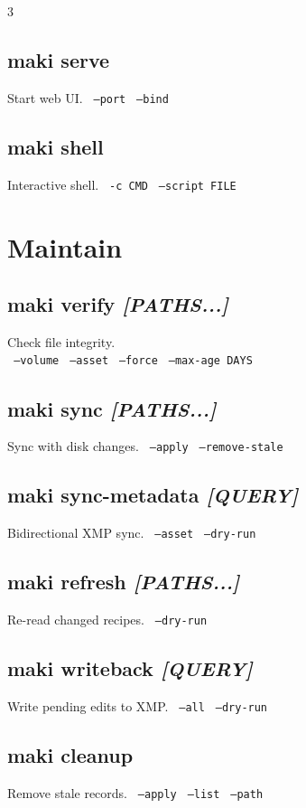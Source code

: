 \documentclass[a4paper,landscape,8pt]{article}
\newcommand{\opt}[1]{\texttt{\scriptsize\color{maki-stone} #1}}
\begin{document}
\begin{multicols}{3}
\subsection{maki serve}
Start web UI. \opt{--port} \opt{--bind}

\subsection{maki shell}
Interactive shell. \opt{-c CMD} \opt{--script FILE}

\section{Maintain}

\subsection{maki verify \textit{[PATHS...]}}
Check file integrity. \\
\opt{--volume} \opt{--asset} \opt{--force} \opt{--max-age DAYS}

\subsection{maki sync \textit{[PATHS...]}}
Sync with disk changes. \opt{--apply} \opt{--remove-stale}

\subsection{maki sync-metadata \textit{[QUERY]}}
Bidirectional XMP sync. \opt{--asset} \opt{--dry-run}

\subsection{maki refresh \textit{[PATHS...]}}
Re-read changed recipes. \opt{--dry-run}

\subsection{maki writeback \textit{[QUERY]}}
Write pending edits to XMP. \opt{--all} \opt{--dry-run}

\subsection{maki cleanup}
Remove stale records. \opt{--apply} \opt{--list} \opt{--path}


\end{multicols}
\end{document}
